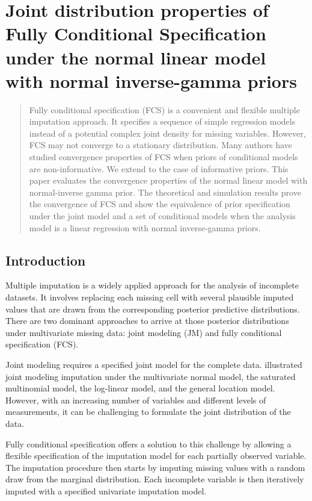 \chapter{Joint distribution properties of Fully Conditional Specification under the normal linear model with normal inverse-gamma priors}
\label{chap5}
	\begin{abstract}
		Fully conditional specification (FCS) is a convenient and flexible multiple imputation approach. It specifies a sequence of simple regression models instead of a potential complex joint density for missing variables. However, FCS may not converge to a stationary distribution. Many authors have studied convergence properties of FCS when priors of conditional models are non-informative. We extend to the case of informative priors. This paper evaluates the convergence properties of the normal linear model with normal-inverse gamma prior. The theoretical and simulation results prove the convergence of FCS and show the equivalence of prior specification under the joint model and a set of conditional models when the analysis model is a linear regression with normal inverse-gamma priors.  
	\end{abstract}
	
	\section{Introduction}
	Multiple imputation \citep{RubinD1987} is a widely applied approach for the analysis of incomplete datasets. It involves replacing each missing cell with several plausible imputed values that are drawn from the corresponding posterior predictive distributions. There are two dominant approaches to arrive at those posterior distributions under multivariate missing data: joint modeling (JM) and fully conditional specification (FCS). 
	
	Joint modeling requires a specified joint model for the complete data. \citet{schafer1997analysis} illustrated joint modeling imputation under the multivariate normal model, the saturated multinomial model, the log-linear model, and the general location model. However, with an increasing number of variables and different levels of measurements, it can be challenging to formulate the joint distribution of the data. 
	
	Fully conditional specification offers a solution to this challenge by allowing a flexible specification of the imputation model for each partially observed variable. The imputation procedure then starts by imputing missing values with a random draw from the marginal distribution. Each incomplete variable is then iteratively imputed with a specified univariate imputation model. 
	
